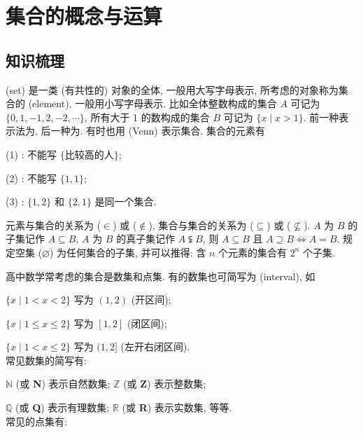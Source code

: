 \section{集合的概念与运算}

\subsection{知识梳理}
 (set) 是一类 (有共性的) 对象的全体, 一般用大写字母表示, 
所考虑的对象称为集合的 (element), 一般用小写字母表示. 
比如全体整数构成的集合 $A$ 可记为 $\{0,1,-1,2,-2,\cdots\}$,
所有大于 1 的数构成的集合 $B$ 可记为 $\{x\mid x>1\}$. 
前一种表示法为, 后一种为. 
有时也用 (Venn) 表示集合.
集合的元素有

(1) : 不能写 $\{\text{比较高的人}\}$;
 
(2) : 不能写 $\{1,1\}$; 

(3) : $\{1,2\}$ 和 $\{2,1\}$ 是同一个集合. 

元素与集合的关系为 ($\in$) 或 ($\notin$),
集合与集合的关系为 ($\subseteq$) 或 ($\nsubseteq$).
$A$ 为 $B$ 的子集记作 $A\subseteq B$, 
$A$ 为 $B$ 的真子集记作 $A\subsetneqq B$, 
则 $A\subseteq B$ 且 $A\supseteq B \Leftrightarrow A=B$.
规定空集 ($\varnothing$) 为任何集合的子集, 
并可以推得: 含 $n$ 个元素的集合有 $2^n$ 个子集.

高中数学常考虑的集合是数集和点集. 有的数集也可简写为 (interval), 
如 

$\{x\mid 1<x<2\}$ 写为 $(1,2)$ (开区间);

$\{x\mid 1\leqslant x\leqslant 2\}$ 写为 $[1,2]$ (闭区间);

$\{x\mid 1< x\leqslant 2\}$ 写为 $(1,2]$ (左开右闭区间).\\
常见数集的简写有: 

$\mathbb{N}$ (或 {\bfseries N}) 表示自然数集; 
$\mathbb{Z}$ (或 {\bfseries Z}) 表示整数集; 

$\mathbb{Q}$ (或 {\bfseries Q}) 表示有理数集;
$\mathbb{R}$ (或 {\bfseries R}) 表示实数集, 等等.\\
常见的点集有: 

